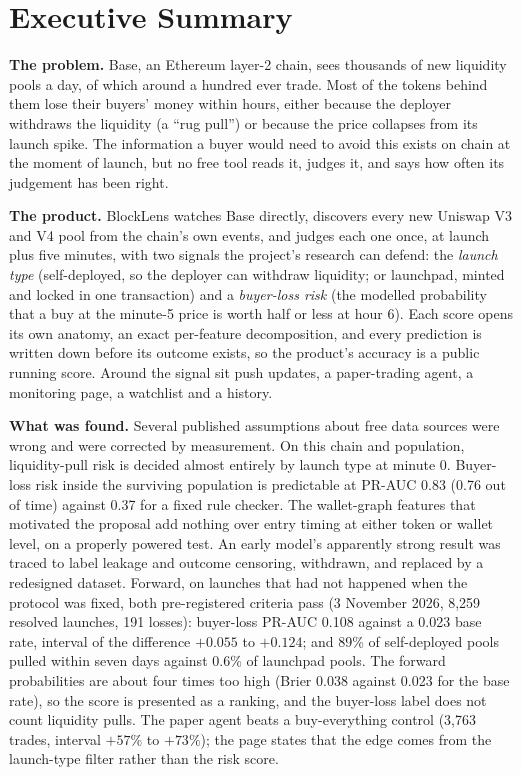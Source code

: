 \chapter*{Executive Summary}

\textbf{The problem.} Base, an Ethereum layer-2 chain, sees thousands of new liquidity pools a day, of which around a hundred ever trade. Most of the tokens behind them lose their buyers' money within hours, either because the deployer withdraws the liquidity (a ``rug pull'') or because the price collapses from its launch spike. The information a buyer would need to avoid this exists on chain at the moment of launch, but no free tool reads it, judges it, and says how often its judgement has been right.

\textbf{The product.} BlockLens watches Base directly, discovers every new Uniswap V3 and V4 pool from the chain's own events, and judges each one once, at launch plus five minutes, with two signals the project's research can defend: the \emph{launch type} (self-deployed, so the deployer can withdraw liquidity; or launchpad, minted and locked in one transaction) and a \emph{buyer-loss risk} (the modelled probability that a buy at the minute-5 price is worth half or less at hour 6). Each score opens its own anatomy, an exact per-feature decomposition, and every prediction is written down before its outcome exists, so the product's accuracy is a public running score. Around the signal sit push updates, a paper-trading agent, a monitoring page, a watchlist and a history.

\textbf{What was found.} Several published assumptions about free data sources were wrong and were corrected by measurement. On this chain and population, liquidity-pull risk is decided almost entirely by launch type at minute 0. Buyer-loss risk inside the surviving population is predictable at PR-AUC 0.83 (0.76 out of time) against 0.37 for a fixed rule checker. The wallet-graph features that motivated the proposal add nothing over entry timing at either token or wallet level, on a properly powered test. An early model's apparently strong result was traced to label leakage and outcome censoring, withdrawn, and replaced by a redesigned dataset. Forward, on launches that had not happened when the protocol was fixed, both pre-registered criteria pass (3 November 2026, 8,259 resolved launches, 191 losses): buyer-loss PR-AUC 0.108 against a 0.023 base rate, interval of the difference $+0.055$ to $+0.124$; and 89\% of self-deployed pools pulled within seven days against 0.6\% of launchpad pools. The forward probabilities are about four times too high (Brier 0.038 against 0.023 for the base rate), so the score is presented as a ranking, and the buyer-loss label does not count liquidity pulls. The paper agent beats a buy-everything control (3,763 trades, interval $+57\%$ to $+73\%$); the page states that the edge comes from the launch-type filter rather than the risk score.

